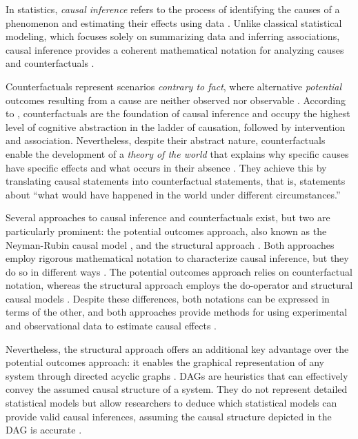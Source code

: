 \documentclass[
  authoryear,
  preprint,
  1p]{elsarticle}
\begin{document}
In statistics, \emph{causal inference} refers to the process of
identifying the causes of a phenomenon and estimating their effects
using data \citep{Shaughnessy_et_al_2010, Neal_2020}. Unlike classical
statistical modeling, which focuses solely on summarizing data and
inferring associations, causal inference provides a coherent
mathematical notation for analyzing causes and counterfactuals
\citep{Pearl_2009}.

Counterfactuals represent scenarios \emph{contrary to fact}, where
alternative \emph{potential} outcomes resulting from a cause are neither
observed nor observable \citep{Neal_2020, Counterfactual_2024}.
According to \citet{Pearl_et_al_2018}, counterfactuals are the
foundation of causal inference and occupy the highest level of cognitive
abstraction in the ladder of causation, followed by intervention and
association. Nevertheless, despite their abstract nature,
counterfactuals enable the development of a \emph{theory of the world}
that explains why specific causes have specific effects and what occurs
in their absence \citep{Pearl_et_al_2018}. They achieve this by
translating causal statements into counterfactual statements, that is,
statements about ``what would have happened in the world under different
circumstances.''

Several approaches to causal inference and counterfactuals exist, but
two are particularly prominent: the potential outcomes approach, also
known as the Neyman-Rubin causal model
\citep{Neyman_et_al_1923, Rubin_1974}, and the structural approach
\citep{Wright_1921, Pearl_2009, Pearl_et_al_2016}. Both approaches
employ rigorous mathematical notation to characterize causal inference,
but they do so in different ways \citep{Neal_2020}. The potential
outcomes approach relies on counterfactual notation, whereas the
structural approach employs the do-operator and structural causal models
\citep[SCM,][]{Pearl_2009, Pearl_et_al_2016}. Despite these differences,
both notations can be expressed in terms of the other, and both
approaches provide methods for using experimental and observational data
to estimate causal effects \citep{Pearl_2010}.

Nevertheless, the structural approach offers an additional key advantage
over the potential outcomes approach: it enables the graphical
representation of any system through directed acyclic graphs
\citep[DAG,][]{Gross_et_al_2018, Neal_2020}. DAGs are heuristics that
can effectively convey the assumed causal structure of a system. They do
not represent detailed statistical models but allow researchers to
deduce which statistical models can provide valid causal inferences,
assuming the causal structure depicted in the DAG is accurate
\citep{McElreath_2020}.
\end{document}
